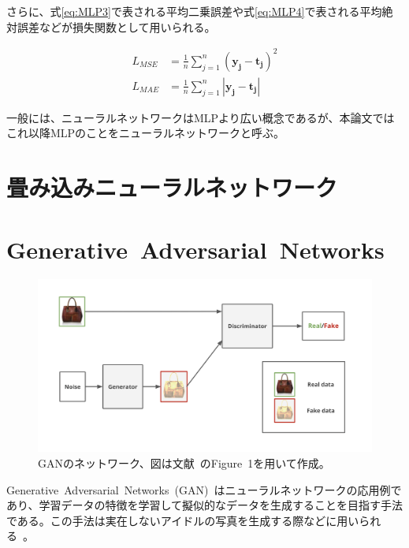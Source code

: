 さらに、式\ref{eq:MLP3}で表される平均二乗誤差や式\ref{eq:MLP4}で表される平均絶対誤差などが損失関数として用いられる。

\begin{align}
    \label{eq:MLP3}
    L_{MSE}&=\frac{1}{n}\sum _{j=1} ^{n} {(\boldsymbol{y_j} - \boldsymbol{t_j})^2}\\
    \label{eq:MLP4}
    L_{MAE}&=\frac{1}{n}\sum _{j=1} ^{n} {|\boldsymbol{y_j} - \boldsymbol{t_j}|}
\end{align}

一般には、ニューラルネットワークはMLPより広い概念であるが、本論文ではこれ以降MLPのことをニューラルネットワークと呼ぶ。

\section{畳み込みニューラルネットワーク}


\section{Generative~Adversarial~Networks}

\begin{figure}[t]
\begin{center}
\includegraphics[width=\hsize]{figure/GAN_net.png}
\caption{GANのネットワーク、図は文献~\cite{pix2pix}のFigure~1を用いて作成。}
\label{fig:GAN_net}
\end{center}
\end{figure}

Generative~Adversarial~Networks~(GAN)~\cite{GAN}はニューラルネットワークの応用例であり、学習データの特徴を学習して擬似的なデータを生成することを目指す手法である。この手法は実在しないアイドルの写真を生成する際などに用いられる~\cite{idol}。

